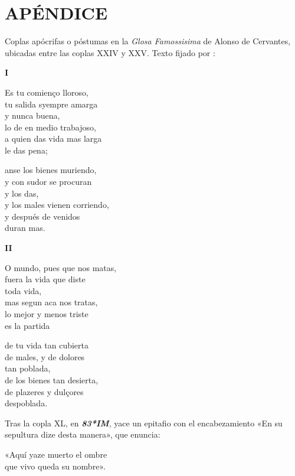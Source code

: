 \documentclass[11pt]{article}
\newcommand{\im}{\emph{\textbf{83*IM}}}
\newcommand{\comillas}[1]{«#1»}
\begin{document}
\section*{\centering APÉNDICE}
%
\noindent Coplas apócrifas o póstumas en la \emph{Glosa Famossisima} de Alonso de Cervantes, ubicadas entre las coplas XXIV y XXV. Texto fijado por \textcite{Foulché-Delbosc1902}:\par
%
\begin{center}
\textbf{I}
\end{center}
\bnum
\postart
		Es tu comienço lloroso,\\
		tu salida syempre amarga\\
		y nunca buena,\\
		lo de en medio trabajoso,\\
		a quien das vida mas larga\\
		le das pena;\par
		anse los bienes muriendo,\\
		y con sudor se procuran\\
		y los das,\\
		y los males vienen corriendo,\\
		y después de venidos\\
		duran mas.\par
		\poend
		\bnum
%
\begin{center}
\textbf{II}
\end{center}
		\bnum
		\postart
		O mundo, pues que nos matas,\\
		fuera la vida que diste\\
		toda vida,\\
		mas segun aca nos tratas,\\
		lo mejor y menos triste\\
		es la partida\par
		de tu vida tan cubierta\\
		de males, y de dolores\\
		tan poblada,\\
		de los bienes tan desierta,\\
		de plazeres y dulçores\\
		despoblada.\par
		\poend
		\enum\par
%
\vspace*{14pt}
%
Tras la copla XL, en {\im}, yace un epitafio con el encabezamiento \comillas{En su sepultura dize desta manera}, que enuncia:\vskip5pt\par
%
\bnum
\postart
\comillas{Aquí yaze muerto el ombre\\
	que vivo queda su nombre}.
\poend
\enum
\enpage
%
\end{document}
